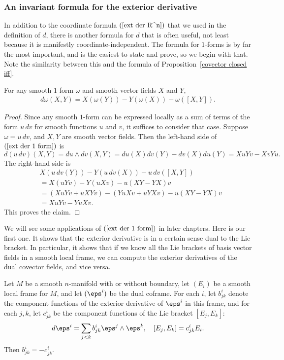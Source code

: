 \subsubsection{An invariant formula for the exterior derivative}
In addition to the coordinate formula $(\ref{ext der R^n})$ that we used in the definition of $d$, there is another formula for $d$ that is often useful, not least because it is manifestly coordinate-independent. The formula for $1$-forms is by far the most important, and is the easiest to state and prove, so we begin with that. Note the similarity between this and the formula of Proposition~\ref{covector closed iff}.
\begin{proposition}
For any smooth $1$-form $\omega$ and smooth vector fields $X$ and $Y$,
\begin{align}\label{ext der 1 form}
d\omega(X,Y)=X(\omega(Y))-Y(\omega(X))-\omega([X,Y]).
\end{align}
\end{proposition}
\begin{proof}
Since any smooth $1$-form can be expressed locally as a sum of terms of the form $u\,dv$ for smooth functions $u$ and $v$, it suffices to consider that case. Suppose $\omega=u\,dv$, and $X,Y$ are smooth vector fields. Then the left-hand side of $(\ref{ext der 1 form})$ is
\[d(u\,dv)(X,Y)=du\wedge dv(X,Y)=du(X)dv(Y)-dv(X)du(Y)=XuYv-XvYu.\]
The right-hand side is
\begin{align*}
&X(u\,dv(Y))-Y(u\,dv(X))-u\,dv([X,Y])\\
&=X(uYv)-Y(uXv)-u(XY-YX)v\\
&=(XuYv+uXYv)-(YuXv+uYXv)-u(XY-YX)v\\
&=XuYv-YuXv.
\end{align*}
This proves the claim.
\end{proof}
We will see some applications of $(\ref{ext der 1 form})$ in later chapters. Here is our first one. It shows that the exterior derivative is in a certain sense dual to the Lie bracket. In particular, it shows that if we know all the Lie brackets of basis vector fields in a smooth local frame, we can compute the exterior derivatives of the dual covector fields, and vice versa.
\begin{proposition}
Let $M$ be a smooth $n$-manifold with or without boundary, let $(E_i)$ be a smooth local frame for $M$, and let $(\eps^i)$ be the dual coframe. For each $i$, let $b^i_{jk}$ denote the component functions of the exterior derivative of $\eps^i$ in this frame, and for each $j,k$, let $c^i_{jk}$ be the component functions of the Lie bracket $[E_j,E_k]$:
\[d\eps^i=\sum_{j<k}b^i_{jk}\eps^j\wedge\eps^k,\quad [E_j,E_k]=c^i_{jk}E_i.\]
Then $b^i_{jk}=-c^i_{jk}$.
\end{proposition}
